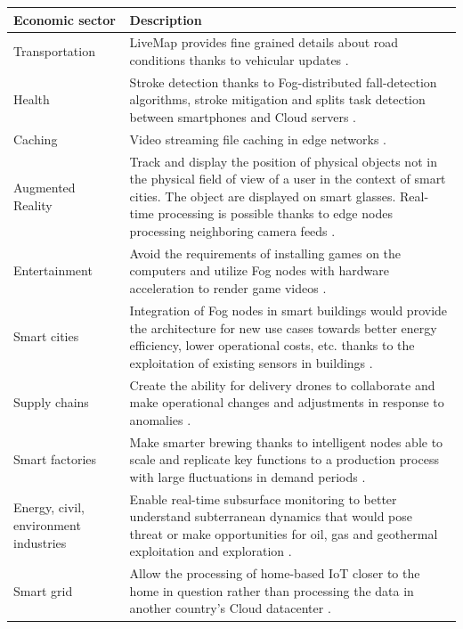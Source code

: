 \documentclass[11pt]{sdm}
\begin{document}
\begin{table}[t]
	\begin{tabular}{|p{3cm}|p{12cm}|}
		\hline
		Economic sector & Description 
		\\[0.5cm]
		\hline
		Transportation 
		& LiveMap provides fine grained details about road conditions thanks to vehicular updates \cite{hu_live_2017}.
		\\
		Health 
		& Stroke detection thanks to Fog-distributed fall-detection algorithms, stroke mitigation and splits task detection between smartphones and Cloud servers \cite{hu_survey_2017}.
		\\
		Caching
		& Video streaming file caching in edge networks \cite{ma_understanding_2017}.
		\\
		Augmented Reality
		& Track and display the position of physical objects not in the physical field of view of a user in the context of smart cities. The object are displayed on smart glasses. Real-time processing is possible thanks to edge nodes processing neighboring camera feeds \cite{rausch_towards_2021, rausch_cognitivexr_2020}.
		\\
		Entertainment 
		& Avoid the requirements of installing games on the computers and utilize Fog nodes with hardware acceleration to render game videos \cite{lin_cloudfog_2017}.
		\\
		Smart cities 
		& Integration of Fog nodes in smart buildings would provide the architecture for new use cases towards better energy efficiency, lower operational costs, etc. thanks to the exploitation of existing sensors in buildings \cite{ieee_standards_association_smart_2018}.
		\\
		Supply chains 
		& Create the ability for delivery drones to collaborate and make operational changes and adjustments in response to anomalies \cite{openfog_consortium_out_2018}.
		\\
		Smart factories 
		& Make smarter brewing thanks to intelligent nodes able to scale and replicate key functions to a production process with large fluctuations in demand periods \cite{openfog_consortium_process_2018}.
		\\
		Energy, civil, environment industries 
		& Enable real-time subsurface monitoring to better understand subterranean dynamics that would pose threat or make opportunities for oil, gas and geothermal exploitation and exploration \cite{openfog_consortium_real-time_2018}.
		\\
		Smart grid 
		& Allow the processing of home-based \gls{IoT} closer to the home in question rather than processing the data in another country's Cloud datacenter \cite{chen_design_2018}.

\end{tabular}
\end{table}
\end{document}
